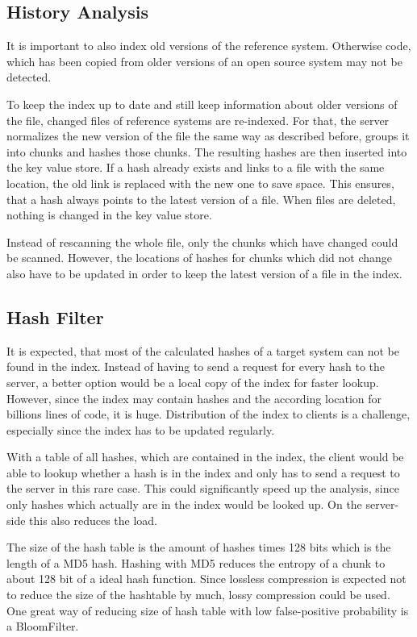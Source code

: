 \subsection{History Analysis}\label{section:approach/creating_index/history_analysis}
It is important to also index old versions of the reference system.
Otherwise code, which has been copied from older versions of an open source system may not be detected.

To keep the index up to date and still keep information about older versions of the file, changed files of reference systems are re-indexed.
For that, the server normalizes the new version of the file the same way as described before, groups it into chunks and hashes those chunks.
The resulting hashes are then inserted into the key value store.
If a hash already exists and links to a file with the same location, the old link is replaced with the new one to save space.
This ensures, that a hash always points to the latest version of a file.
When files are deleted, nothing is changed in the key value store.

Instead of rescanning the whole file, only the chunks which have changed could be scanned.
However, the locations of hashes for chunks which did not change also have to be updated  in order to keep the latest version of a file in the index.


\subsection{Hash Filter}\label{section:approach/creating_index/hash_filter}
It is expected, that most of the calculated hashes of a target system can not be found in the index.
Instead of having to send a request for every hash to the server, a better option would be a local copy of the index for faster lookup.
However, since the index may contain hashes and the according location for billions lines of code, it is huge.
Distribution of the index to clients is a challenge, especially since the index has to be updated regularly.

With a table of all hashes, which are contained in the index, the client would be able to lookup whether a hash is in the index and only has to send a request to the server in this rare case.
This could significantly speed up the analysis, since only hashes which actually are in the index would be looked up.
On the server-side this also reduces the load.

The size of the hash table is the amount of hashes times 128 bits which is the length of a MD5 hash.
Hashing with MD5 reduces the entropy of a chunk to about 128 bit of a ideal hash function.
Since lossless compression is expected not to reduce the size of the hashtable by much, lossy compression could be used.
One great way of reducing size of hash table with low false-positive probability is a BloomFilter.

